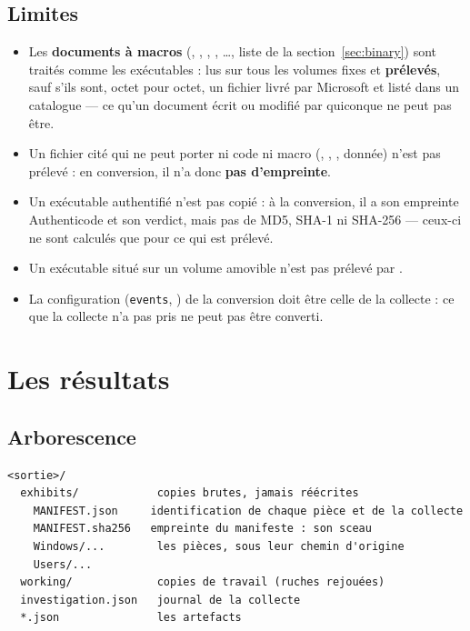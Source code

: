 \documentclass[11pt,a4paper,oneside]{report}
\begin{document}
\section{Limites}

\begin{itemize}
  \item Les \textbf{documents à macros} (, ,
        , , \ldots, liste de la
        section~\ref{sec:binary}) sont traités comme les exécutables : lus sur
        tous les volumes fixes et \textbf{prélevés}, sauf s'ils sont, octet pour
        octet, un fichier livré par Microsoft et listé dans un catalogue — ce
        qu'un document écrit ou modifié par quiconque ne peut pas être.
  \item Un fichier cité qui ne peut porter ni code ni macro (,
        , , donnée) n'est pas prélevé : en
        conversion, il n'a donc \textbf{pas d'empreinte}.
  \item Un exécutable authentifié n'est pas copié : à la conversion, il a son
        empreinte Authenticode et son verdict, mais pas de MD5, SHA-1 ni
        SHA-256 — ceux-ci ne sont calculés que pour ce qui est prélevé.
  \item Un exécutable situé sur un volume amovible n'est pas prélevé par
         .
  \item La configuration (\texttt{events}, ) de la conversion doit
        être celle de la collecte : ce que la collecte n'a pas pris ne peut pas être
        converti.
\end{itemize}

\chapter{Les résultats}

\section{Arborescence}

\begin{lstlisting}
<sortie>/
  exhibits/            copies brutes, jamais réécrites
    MANIFEST.json     identification de chaque pièce et de la collecte
    MANIFEST.sha256   empreinte du manifeste : son sceau
    Windows/...        les pièces, sous leur chemin d'origine
    Users/...
  working/             copies de travail (ruches rejouées)
  investigation.json   journal de la collecte
  *.json               les artefacts
\end{lstlisting}
\end{document}
